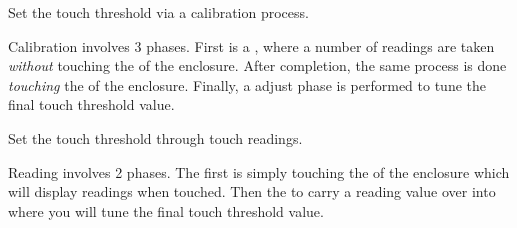 
 \par\medskip

Set the touch threshold via a calibration process.

\par\medskip

Calibration involves \num{3} phases.  First is a , where a number of
readings are taken \textit{without} touching the  of the enclosure.
After completion, the same process is done \textit{touching} the  of the
enclosure.  Finally, a  adjust phase is performed to tune the final
touch threshold value.


 \par\medskip

Set the touch threshold through touch readings.

\par\medskip

Reading involves \num{2} phases.  The first is simply touching the  of
the enclosure which will display readings when touched. Then  the 
to carry a reading value over into  where you will tune the final touch
threshold value.


